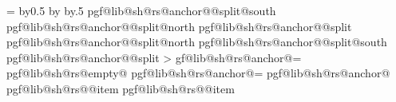 {{                        \ifnum\pgfmathcounter=\parts%
                        \else%
                            \advance\pgf@xa by0.5\pgf@xb%
                            \advance\pgf@xa by\innerxsep\relax%
                            \advance\pgf@xa by.5\pgflinewidth%
                            \expandafter\pgfextract@process\csname pgf@lib@sh@rs@anchor@\pgf@lib@sh@rs@number @split@south\endcsname{%
                                \southwest%
                                \pgf@x=\pgf@xa%
                            }%
                            \expandafter\pgfextract@process\csname pgf@lib@sh@rs@anchor@\pgf@lib@sh@rs@number @split@north\endcsname{%
                                \northeast%
                                \pgf@x=\pgf@xa%
                            }%
                            \expandafter\pgfextract@process\csname pgf@lib@sh@rs@anchor@\pgf@lib@sh@rs@number @split\endcsname{%
                                \centerpoint%
                                \pgf@x=\pgf@xa%
                            }%
                            \expandafter\addtosavedmacro\csname pgf@lib@sh@rs@anchor@\pgf@lib@sh@rs@number @split@north\endcsname%
                            \expandafter\addtosavedmacro\csname pgf@lib@sh@rs@anchor@\pgf@lib@sh@rs@number @split@south\endcsname%
                            \expandafter\addtosavedmacro\csname pgf@lib@sh@rs@anchor@\pgf@lib@sh@rs@number @split\endcsname%
                        \fi%
                    \fi%
            \repeatpgfmathloop%
        \else%
            \pgf@y=0pt\relax%
            \pgfmathloop%
                \ifnum\pgfmathcounter>\parts%
                \else%
                    \pgf@lib@sh@getalpha\pgf@lib@sh@rs@number{\pgfmathcounter}%
                    \expandafter\let\csname pgf@lib@sh@rs@anchor@\pgf@lib@sh@rs@number\endcsname=\pgfutil@empty%
                    \expandafter\ifx\csname pgf@lib@sh@rs@empty@\pgf@lib@sh@rs@number\endcsname\pgfutil@empty%
                        \ifpgfrectanglesplitignoreemptyparts%
                            \expandafter\let\csname pgf@lib@sh@rs@anchor@\pgf@lib@sh@rs@number\endcsname=%
                                \pgf@lib@sh@rs@lastanchor%
                        \fi%
                    \fi%
                    \expandafter\ifx\csname pgf@lib@sh@rs@anchor@\pgf@lib@sh@rs@number\endcsname\pgfutil@empty%
                        \expandafter\ifx\csname pgf@lib@sh@rs@\pgf@lib@sh@rs@number @item\endcsname%
                                \pgf@lib@sh@rs@lefttext%
                            \pgf@x=0pt\relax%
                        \else%
                            \expandafter\ifx\csname pgf@lib@sh@rs@\pgf@lib@sh@rs@number @item\endcsname%
}}
